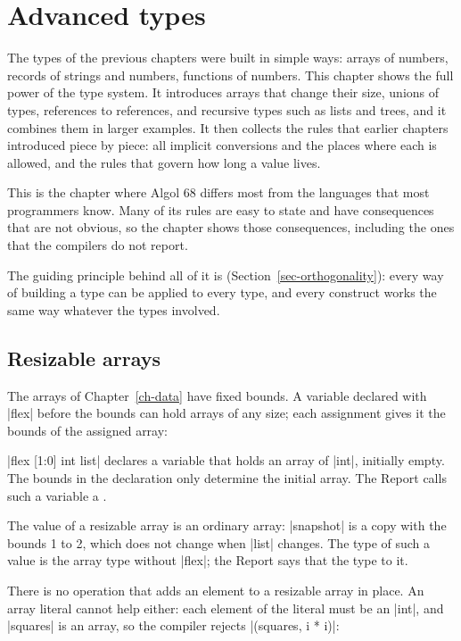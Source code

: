 \chapter{Advanced types}\label{ch-advanced}

The types of the previous chapters were built in simple ways: arrays of
numbers, records of strings and numbers, functions of numbers. This
chapter shows the full power of the type system. It introduces arrays
that change their size, unions of types, references to references, and
recursive types such as lists and trees, and it combines them in larger
examples. It then collects the rules that earlier chapters introduced
piece by piece: all implicit conversions and the places where each is
allowed, and the rules that govern how long a value lives.

This is the chapter where Algol 68 differs most from the languages that
most programmers know. Many of its rules are easy to state and have
consequences that are not obvious, so the chapter shows those
consequences, including the ones that the compilers do not report.

The guiding principle behind all of it is 
(Section~\ref{sec-orthogonality}): every way of building a type can be
applied to every type, and every construct works the same way whatever
the types involved.

\section{Resizable arrays}\label{sec-flex}

The arrays of Chapter~\ref{ch-data} have fixed bounds. A variable declared with
\code|flex| before the bounds can hold arrays of any size; each assignment
gives it the bounds of the assigned array:


\code|flex [1:0] int list| declares a variable that holds an array of
\code|int|, initially empty. The bounds in the declaration only determine
the initial array. The Report calls such a variable a .

The value of a resizable array is an ordinary array: \code|snapshot| is
a copy with the bounds 1 to 2, which does not change when \code|list|
changes. The type of such a value is the array type without
\code|flex|; the Report says that the type  to it.

There is no operation that adds an element to a resizable array in
place. An array literal cannot help either: each element of the literal
must be an \code|int|, and \code|squares| is an array, so the compiler
rejects \code|(squares, i * i)|:

